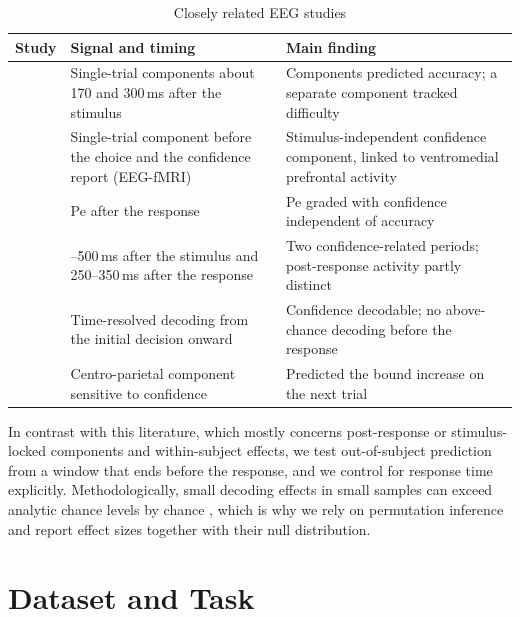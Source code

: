 \documentclass[11pt,a4paper]{article}
\begin{document}
\begin{table}[ht]
\centering
\caption{Closely related EEG studies}
\label{tab:related}
\small
\begin{tabularx}{\textwidth}{@{}l>{\raggedright\arraybackslash}X>{\raggedright\arraybackslash}X@{}}
\toprule
\textbf{Study} & \textbf{Signal and timing} & \textbf{Main finding}\\
\midrule
\cite{r10} & Single-trial components about 170 and 300\,ms after the stimulus & Components predicted accuracy; a separate component tracked difficulty\\
\cite{r2} & Single-trial component before the choice and the confidence report (EEG-fMRI) & Stimulus-independent confidence component, linked to ventromedial prefrontal activity\\
\cite{r3} & Pe after the response & Pe graded with confidence independent of accuracy\\
\cite{r18} & 350--500\,ms after the stimulus and 250--350\,ms after the response & Two confidence-related periods; post-response activity partly distinct\\
\cite{r5} & Time-resolved decoding from the initial decision onward & Confidence decodable; no above-chance decoding before the response\\
\cite{r22} & Centro-parietal component sensitive to confidence & Predicted the bound increase on the next trial\\
\bottomrule
\end{tabularx}
\end{table}

In contrast with this literature, which mostly concerns post-response or stimulus-locked components and within-subject effects, we test out-of-subject prediction from a window that ends before the response, and we control for response time explicitly. Methodologically, small decoding effects in small samples can exceed analytic chance levels by chance \cite{r23}, which is why we rely on permutation inference and report effect sizes together with their null distribution.

\section{Dataset and Task}
\end{document}
